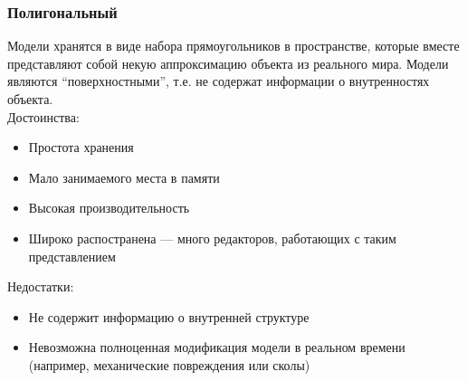 \documentclass[a4paper,12pt]{report}
\numberwithin{equation}{section}
\begin{document}
\subsubsection*{Полигональный}
Модели хранятся в виде набора прямоугольников в пространстве, которые вместе представляют собой некую аппроксимацию объекта из реального мира. Модели являются ``поверхностными'', т.е. не содержат информации о внутренностях объекта. \\
Достоинства:
\begin{itemize}
\item Простота хранения
\item Мало занимаемого места в памяти
\item Высокая производительность
\item Широко распостранена --- много редакторов, работающих с таким представлением
\end{itemize}
Недостатки:
\begin{itemize}
\item Не содержит информацию о внутренней структуре
\item Невозможна полноценная модификация модели в реальном времени (например, механические повреждения или сколы)
\end{itemize}
\end{document}

